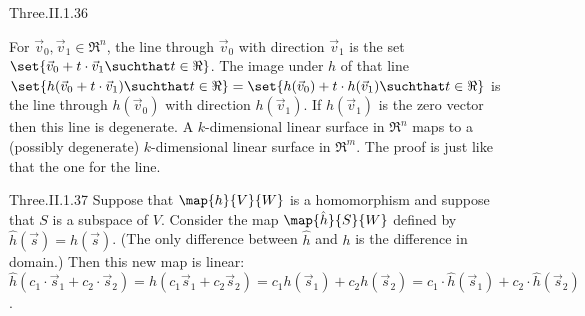 \begin{ans}{Three.II.1.36}
      \begin{exparts}
        \partsitem For \( \vec{v}_0,\vec{v}_1\in\Re^n \), the line through
          \( \vec{v}_0 \) with direction \( \vec{v}_1 \) is the set
          $\set{\vec{v}_0+t\cdot \vec{v}_1\suchthat t\in\Re}$.
          The image under $h$ of that line
          $\set{h(\vec{v}_0+t\cdot \vec{v}_1)\suchthat t\in\Re}
             =\set{h(\vec{v}_0)+t\cdot h(\vec{v}_1)\suchthat t\in\Re}$
          is the line through $h(\vec{v}_0)$ with direction $h(\vec{v}_1)$.
          If \( h(\vec{v}_1) \) is the zero vector then this line is
          degenerate.
        \partsitem A \( k \)-dimensional linear surface in \( \Re^n \) maps to
          a (possibly degenerate) \( k \)-dimensional linear surface in
          \( \Re^m \).
          The proof is just like that the one for the line.
      \end{exparts}
     
\end{ans}
\begin{ans}{Three.II.1.37}
      Suppose that \( \map{h}{V}{W} \) is a homomorphism and suppose
      that \( S \) is a subspace of \( V \).
      Consider the map \( \map{\hat{h}}{S}{W} \) defined by
      \( \hat{h}(\vec{s})=h(\vec{s}) \).
      (The only difference between $\hat{h}$ and $h$ is the difference in
      domain.)
      Then this new map is linear:
      \( \hat{h}(c_1\cdot\vec{s}_1+c_2\cdot\vec{s}_2)=
              h(c_1\vec{s}_1+c_2\vec{s}_2)=c_1h(\vec{s}_1)+c_2h(\vec{s}_2)=
              c_1\cdot\hat{h}(\vec{s}_1)+c_2\cdot\hat{h}(\vec{s}_2) \).
    
\end{ans}
